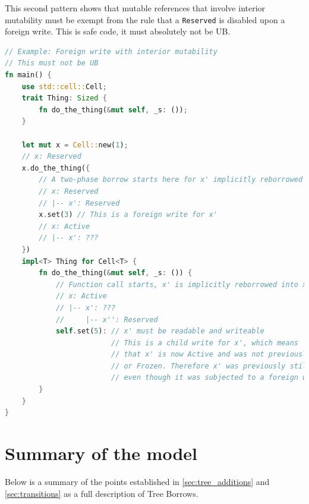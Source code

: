 \documentclass[a4paper,11pt]{article}
\theoremstyle{plain}
\theoremstyle{definition}
\theoremstyle{remark}
\newcommand{\tperm}[1]{\texttt{#1}}
\begin{document}
This second pattern shows that mutable references that involve interior mutability
must be exempt from the rule that a \tperm{Reserved} is disabled upon a foreign
write. This is safe code, it must absolutely not be UB.
\begin{lstlisting}[language=rust]
// Example: Foreign write with interior mutability
// This must not be UB
fn main() {
    use std::cell::Cell;
    trait Thing: Sized {
        fn do_the_thing(&mut self, _s: ());
    }

    let mut x = Cell::new(1);
    // x: Reserved
    x.do_the_thing({
        // A two-phase borrow starts here for x' implicitly reborrowed from x
        // x: Reserved
        // |-- x': Reserved
        x.set(3) // This is a foreign write for x'
        // x: Active
        // |-- x': ???
    })
    impl<T> Thing for Cell<T> {
        fn do_the_thing(&mut self, _s: ()) {
            // Function call starts, x' is implicitly reborrowed into x''
            // x: Active
            // |-- x': ???
            //     |-- x'': Reserved
            self.set(5): // x' must be readable and writeable
                         // This is a child write for x', which means
                         // that x' is now Active and was not previously Disabled
                         // or Frozen. Therefore x' was previously still Reserved,
                         // even though it was subjected to a foreign write.
        }
    }
}
\end{lstlisting}



\newpage
\section{Summary of the model}

Below is a summary of the points established in \ref{sec:tree_additions} and \ref{sec:transitions}
as a full description of Tree Borrows.
\end{document}
